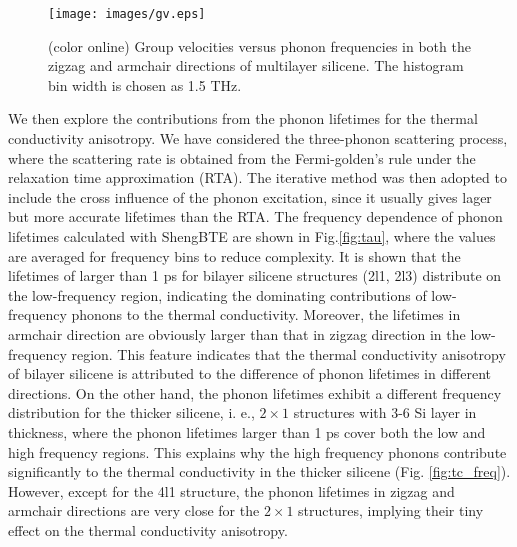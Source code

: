 \documentclass[aps,prb,twocolumn,showpacs,amsmath,amssymb]{revtex4-1}
\begin{document}
\begin{figure}[b]
  \texttt{[image: images/gv.eps]}{}
  \caption{\label{fig:gv} (color online) Group velocities versus phonon frequencies in both the zigzag and armchair directions of multilayer silicene. The histogram bin width is chosen as 1.5 THz.}
\end{figure}
We then explore the contributions from the phonon lifetimes for the thermal conductivity anisotropy.
We have considered the three-phonon scattering process, where the scattering rate is obtained from the Fermi-golden's rule\cite{Li2014} under the relaxation time approximation (RTA). The iterative method was then adopted to include the cross influence of the phonon excitation, since it usually gives lager but more accurate lifetimes than the RTA. The frequency dependence of phonon lifetimes calculated with ShengBTE\cite{Li2014} are shown in Fig.\ref{fig:tau}, where the values are averaged for frequency bins to reduce complexity.  It is shown that the lifetimes of larger than 1 ps for bilayer silicene structures (2l1, 2l3) distribute on the low-frequency region, indicating the dominating contributions of low-frequency phonons to the thermal conductivity. Moreover, the lifetimes in armchair direction are obviously larger than that in zigzag direction in the low-frequency region. This feature indicates that the thermal conductivity anisotropy of bilayer silicene is attributed to the difference of phonon lifetimes in different directions.
On the other hand, the phonon lifetimes exhibit a different frequency distribution for the thicker silicene, i. e.,  $2\times1$ structures with 3-6 Si layer in thickness, where the phonon lifetimes larger than 1 ps cover both the low and high frequency regions.  This explains why the high frequency phonons contribute significantly to the thermal conductivity in the thicker silicene (Fig. \ref{fig:tc_freq}).  However, except for the 4l1 structure, the phonon lifetimes in zigzag and armchair directions are very close for the $2\times1$ structures, implying their tiny effect on the thermal conductivity anisotropy.
\end{document}
